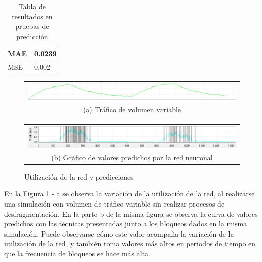 \begin{table}[H]
\centering
    \caption{Tabla de resultados en pruebas de predicción}
    \begin{tabular}{|l|l|}
        \hline
        MAE & 0.0239 \\ \hline
        MSE & 0.002  \\ \hline
    \end{tabular}
    \label{table:resultadosPrediccionTabla}
\end{table}
\newpage
\begin{figure}[H]
    \centering
    \begin{tabular}{@{}c@{}}
        \includegraphics[width=1\textwidth]{capitulos/img/trafico_1.png}\\
        \small (a) Tráfico de volumen variable
    \end{tabular}
    \begin{tabular}{@{}c@{}}
        \includegraphics[width=1\textwidth]{capitulos/img/grafico_prediccion_usnet.PNG}\\
        \small (b) Gráfico de valores predichos por la red neuronal
    \end{tabular}
    \caption{Utilización de la red y predicciones}
    \label{fig:utilizacionPredicciones}
\end{figure}
En la Figura \ref{fig:utilizacionPredicciones} - a se observa la variación de la utilización de la red, al realizarse una simulación con volumen de tráfico variable sin realizar procesos de desfragmentación. En la parte b de la misma figura se observa la curva de valores predichos con las técnicas presentadas junto a los bloqueos dados en la misma simulación. Puede observarse cómo este valor acompaña la variación de la utilización de la red, y también toma valores más altos en periodos de tiempo en que la frecuencia de bloqueos se hace más alta. 
